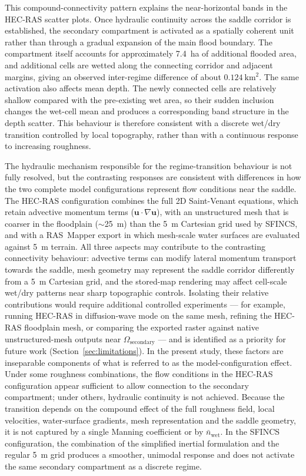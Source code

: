 \documentclass[a4paper,fleqn]{cas-sc}
\newcommand{\sfincs}{\textsc{SFINCS}}
\newcommand{\hecras}{\textsc{HEC-RAS}}
\begin{document}
This compound-connectivity pattern explains the near-horizontal bands in the \hecras{} scatter plots. Once hydraulic continuity across the saddle corridor is established, the secondary compartment is activated as a spatially coherent unit rather than through a gradual expansion of the main flood boundary. The compartment itself accounts for approximately 7.4~ha of additional flooded area, and additional cells are wetted along the connecting corridor and adjacent margins, giving an observed inter-regime difference of about $0.124~\mathrm{km^2}$. The same activation also affects mean depth. The newly connected cells are relatively shallow compared with the pre-existing wet area, so their sudden inclusion changes the wet-cell mean and produces a corresponding band structure in the depth scatter. This behaviour is therefore consistent with a discrete wet/dry transition controlled by local topography, rather than with a continuous response to increasing roughness.

The hydraulic mechanism responsible for the regime-transition behaviour is not fully resolved, but the contrasting responses are consistent with differences in how the two complete model configurations represent flow conditions near the saddle. The \hecras{} configuration combines the full 2D Saint-Venant equations, which retain advective momentum terms ($\mathbf{u}\cdot\nabla\mathbf{u}$), with an unstructured mesh that is coarser in the floodplain ($\sim$25~m) than the 5~m Cartesian grid used by \sfincs{}, and with a RAS~Mapper export in which mesh-scale water surfaces are evaluated against 5~m terrain. All three aspects may contribute to the contrasting connectivity behaviour: advective terms can modify lateral momentum transport towards the saddle, mesh geometry may represent the saddle corridor differently from a 5~m Cartesian grid, and the stored-map rendering may affect cell-scale wet/dry patterns near sharp topographic controls. Isolating their relative contributions would require additional controlled experiments --- for example, running \hecras{} in diffusion-wave mode on the same mesh, refining the \hecras{} floodplain mesh, or comparing the exported raster against native unstructured-mesh outputs near $\Omega_{\mathrm{secondary}}$ --- and is identified as a priority for future work (Section~\ref{sec:limitations}). In the present study, these factors are inseparable components of what is referred to as the model-configuration effect. Under some roughness combinations, the flow conditions in the \hecras{} configuration appear sufficient to allow connection to the secondary compartment; under others, hydraulic continuity is not achieved. Because the transition depends on the compound effect of the full roughness field, local velocities, water-surface gradients, mesh representation and the saddle geometry, it is not captured by a single Manning coefficient or by $\bar{n}_{\mathrm{wet}}$. In the \sfincs{} configuration, the combination of the simplified inertial formulation and the regular 5~m grid produces a smoother, unimodal response and does not activate the same secondary compartment as a discrete regime.
\end{document}
